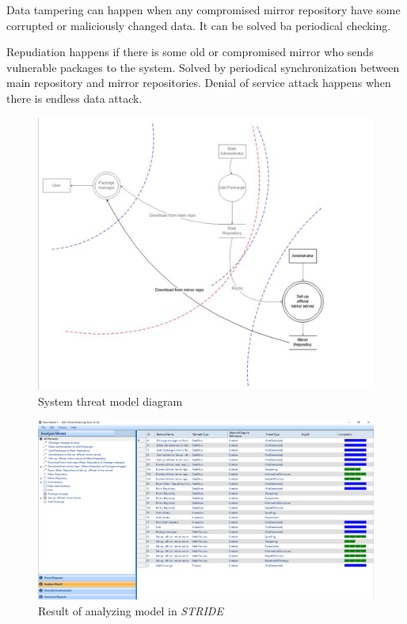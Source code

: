 \documentclass{IEEEtran}
\newcommand{\stride}{\emph{STRIDE}}
\begin{document}
Data tampering can happen when any compromised mirror repository have some corrupted or maliciously changed data. It can be solved ba periodical checking.

Repudiation happens if there is some old or compromised mirror who sends vulnerable packages to the system. Solved by periodical synchronization between main repository and mirror repositories.
Denial of service attack happens when there is endless data attack.

\begin{figure}[ht]
	\centering
	\includegraphics[width=1.0\linewidth]{figures/model}
	\caption[Partial model for motivation example Android app version]{\label{f:stridemodel}System threat model diagram}
\end{figure}

\begin{figure}[ht]
	\centering
	\includegraphics[width=1.0\linewidth]{figures/analyze-model}
	\caption[Partial model for motivation example Android app version]{\label{f:stridemodel}Result of analyzing model in \stride}
\end{figure}
\end{document}
